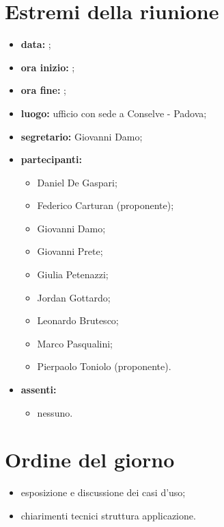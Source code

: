 \documentclass[a4paper,11pt]{article}
\begin{document}
	\section{Estremi della riunione}
	\begin{itemize}
		\item \textbf{data:} ;
		\item \textbf{ora inizio:} ;
		\item \textbf{ora fine:} ;
		\item \textbf{luogo:} ufficio \riskapp{} con sede a Conselve - Padova;
		\item \textbf{segretario:} Giovanni Damo;
		\item \textbf{partecipanti:}
		\begin{itemize}
			 \item Daniel De Gaspari;
			 \item Federico Carturan (proponente);
			 \item Giovanni Damo;
			 \item Giovanni Prete;
			 \item Giulia Petenazzi;
			 \item Jordan Gottardo;
			 \item Leonardo Brutesco;
			 \item Marco Pasqualini;
			 \item Pierpaolo Toniolo (proponente).
		\end{itemize}
		\item \textbf{assenti:}
			\begin{itemize}
					 \item nessuno.
			\end{itemize}
	\end{itemize}
	\section{Ordine del giorno}
		\begin{itemize}
			\item esposizione e discussione dei casi d'uso;
			\item chiarimenti tecnici struttura applicazione.
		\end{itemize}
\end{document}
